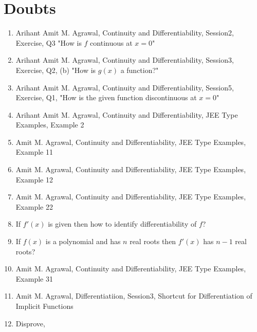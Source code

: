 \documentclass{article}
\title{}
\author{}
\date{}
\begin{document}
\maketitle

\section{Doubts}
\begin{enumerate}
      \item Arihant Amit M. Agrawal, Continuity and Differentiability, Session2, Exercise, Q3 "How is $f$ continuous at $x=0$"
      \item Arihant Amit M. Agrawal, Continuity and Differentiability, Session3, Exercise, Q2, (b) "How is $g(x)$ a function?"
      \item Arihant Amit M. Agrawal, Continuity and Differentiability, Session5, Exercise, Q1, "How is the given function discontinuous at $x=0$"
      \item Arihant Amit M. Agrawal, Continuity and Differentiability, JEE Type Examples, Example 2
      \item Amit M. Agrawal, Continuity and Differentiability, JEE Type Examples, Example 11
      \item Amit M. Agrawal, Continuity and Differentiability, JEE Type Examples, Example 12
      \item Amit M. Agrawal, Continuity and Differentiability, JEE Type Examples, Example 22
      \item If $f'(x)$ is given then how to identify differentiability of $f$?
      \item If $f(x)$ is a polynomial and has $n$ real roots then $f'(x)$ has $n-1$ real roots?
      \item Amit M. Agrawal, Continuity and Differentiability, JEE Type Examples, Example 31
      \item Amit M. Agrawal, Differentiatiion, Session3, Shortcut for Differentiation of Implicit Functions
      \item Disprove,


\end{enumerate}
\end{document}
